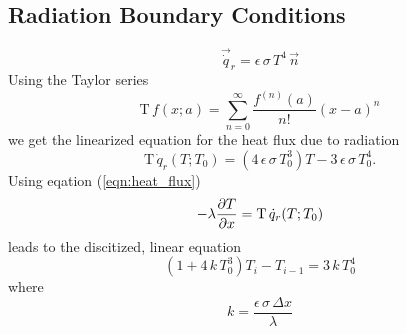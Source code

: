 \subsection{Radiation Boundary Conditions}
\begin{equation}
    \vec{\dot{q}}_r = \epsilon \, \sigma \, T^4 \, \vec n
\end{equation}
Using the Taylor series
\begin{equation}
    \mathrm{T} \, f(x;a) = \sum^{\infty}_{n = 0} \frac{f^{(n)}(a)}{n!}(x - a)^n
\end{equation}
we get the linearized equation for the heat flux due to radiation
\begin{equation}
    \mathrm{T} \, \dot{q}_r(T;T_0) = (4 \, \epsilon \, \sigma \, T_0^3) T - 3 \, \epsilon \, \sigma \, T_0^4.
\end{equation}
Using eqation (\ref{eqn:heat_flux})
\begin{equation}
    -\lambda \pdv{T}{x} = \mathrm{T} \, \dot{q}_r(T;T_0)
\end{equation}
leads to the discitized, linear equation
\begin{equation}
    \left( 1 + 4\,k\,T_0^3 \right) T_i - T_{i - 1}= 3\,k\,T_0^4
\end{equation}
where
\begin{equation}
    k = \frac{\epsilon\,\sigma\,\Delta x}{\lambda}
\end{equation}

